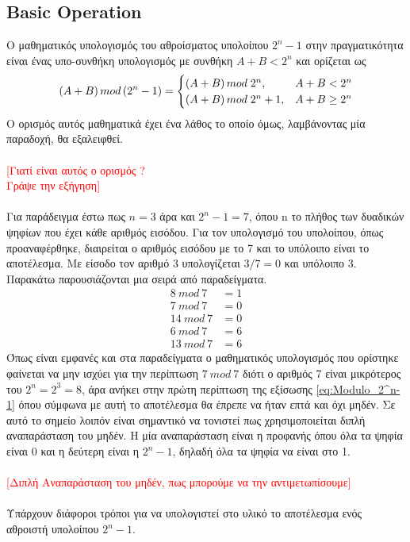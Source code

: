 \subsection{Basic Operation}
Ο μαθηματικός υπολογισμός του αθροίσματος υπολοίπου $2^n-1$ στην πραγματικότητα είναι 
ένας υπο-συνθήκη υπολογισμός με συνθήκη $A+B < 2^n$ και ορίζεται ως 
\begin{equation}
\label{eq:Modulo_2^n-1}
\equationame{Ορισμός άθροισης υπολοίπου $2^n-1$}
(A+B)\, mod\, (2^n-1) = 
\begin{cases}
    (A+B)\, mod\; 2^n       , &  A+B < 2^n\\
    (A+B)\, mod\; 2^n + 1   , & A+B \geq 2^n
\end{cases}
\end{equation}
Ο ορισμός αυτός μαθηματικά έχει ένα λάθος το οποίο όμως, λαμβάνοντας μία 
παραδοχή, θα εξαλειφθεί.
\\\\
\textcolor{red}{[Γιατί είναι αυτός ο ορισμός ? \\ Γράψε την εξήγηση]}
\\\\
Για παράδειγμα έστω πως $n=3$ άρα και $2^n-1 = 7$, όπου n το πλήθος των δυαδικών ψηφίων
που έχει κάθε αριθμός εισόδου. Για τον υπολογισμό του υπολοίπου, όπως προαναφέρθηκε,
διαιρείται ο αριθμός εισόδου με το 7 και το υπόλοιπο είναι το αποτέλεσμα. Με είσοδο 
τον αριθμό 3 υπολογίζεται $3/7 = 0$ και υπόλοιπο 3. Παρακάτω παρουσιάζονται μια σειρά από 
παραδείγματα.
\begin{equation*}
    \begin{split}
        8\ mod\ 7 &= 1 \\
        7\ mod\ 7 &= 0 \\
        14\ mod\ 7 &= 0 \\
        6\ mod\ 7 &= 6 \\
        13\ mod\ 7 &= 6
    \end{split}
\end{equation*}
Όπως είναι εμφανές και στα παραδείγματα ο μαθηματικός υπολογισμός που ορίστηκε φαίνεται να 
μην ισχύει για την περίπτωση $7\ mod\ 7$ διότι ο αριθμός 7 είναι μικρότερος του $2^n = 2^3 = 8$,
άρα ανήκει στην πρώτη περίπτωση της εξίσωσης \ref{eq:Modulo_2^n-1} όπου σύμφωνα με αυτή το 
αποτέλεσμα θα έπρεπε να ήταν επτά και όχι μηδέν. Σε αυτό το σημείο λοιπόν είναι σημαντικό
να τονιστεί πως χρησιμοποιείται διπλή αναπαράσταση του μηδέν. Η μία αναπαράσταση είναι η 
προφανής όπου όλα τα ψηφία είναι 0 και η δεύτερη είναι η $2^n-1$, δηλαδή όλα τα ψηφία 
να είναι στο 1.
\\\\
\textcolor{red}{[Διπλή Αναπαράσταση του μηδέν, πως μπορούμε να την αντιμετωπίσουμε]}
\\\\
Υπάρχουν διάφοροι τρόποι για να υπολογιστεί στο υλικό το αποτέλεσμα 
ενός αθροιστή υπολοίπου $2^n-1$.

